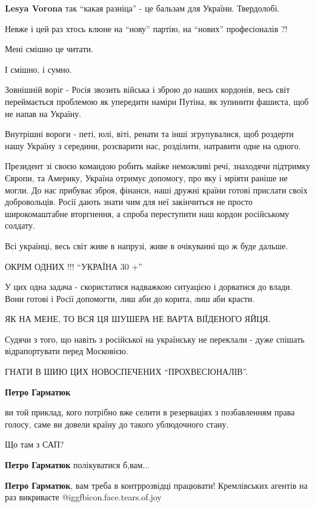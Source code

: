 \begin{itemize}
\textbf{Lesya Vorona} так \enquote{какая разніца} - це бальзам для України. Твердолобі.


Невже і цей раз хтось клюне на \enquote{нову} партію, на \enquote{нових}
професіоналів ?!

Мені смішно це читати.

І смішно, і сумно.

Зовнішній воріг - Росія звозить війська і зброю до наших кордонів, весь світ
переймається проблемою як упередити наміри Путіна, як зупинити фашиста, щоб не
напав на Україну.

Внутрішні вороги - петі, юлі, віті, ренати та інші згрупувалися, щоб роздерти
нашу Україну з середини, розсварити нас, розділити, натравити одне на одного.

Президент зі своєю командою робить майже неможливі речі, знаходячи підтримку
Європи, та Америку, Україна отримує допомогу, про яку і мріяти раніше не могли.
До нас прибуває зброя, фінанси, наші дружні країни готові прислати своїх
добровольців. Росії дають знати чим для неї закінчиться не просто
широкомаштабне вторгнення, а спроба переступити наш кордон російському солдату.

Всі українці, весь світ живе в напрузі, живе в очікуванні що ж буде дальше.

ОКРІМ ОДНИХ !!! \enquote{УКРАЇНА 30 +}

У цих одна задача - скористатися надважкою ситуацією і дорватися до влади. Вони
готові і Росії допомогти, лиш аби до корита, лиш аби красти.

ЯК НА МЕНЕ, ТО ВСЯ ЦЯ ШУШЕРА НЕ ВАРТА ВІЇДЕНОГО ЯЙЦЯ.

Судячи з того, що навіть з російської на українську не переклали - дуже спішать
відрапортувати перед Московією.

ГНАТИ В ШИЮ ЦИХ НОВОСПЕЧЕНИХ \enquote{ПРОХВЕСІОНАЛІВ}.

\begin{itemize} %
\textbf{Петро Гарматюк} 

ви той приклад, кого потрібно вже селити в резерваціях з позбавленням права
голосу, саме ви довели країну до такого ублюдочного стану.

Що там з САП?

\textbf{Петро Гарматюк} полікуватися б,вам...

\textbf{Петро Гарматюк}, вам треба в контррозвідці працювати! Кремлівських агентів на раз викриваєте  @igg{fbicon.face.tears.of.joy} 


\end{itemize}
\end{itemize}
